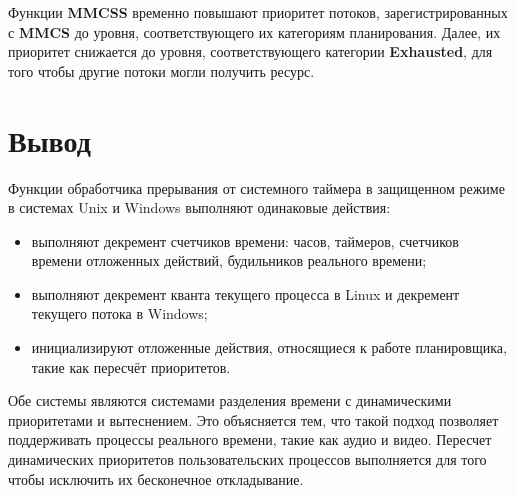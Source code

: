 Функции \textbf{MMCSS} временно повышают приоритет потоков, зарегистрированных с \textbf{MMCS} до уровня, соответствующего их категориям планирования. Далее, их приоритет снижается до уровня, соответствующего категории \textbf{Exhausted}, для того чтобы другие потоки могли получить ресурс.

\section*{Вывод}

Функции обработчика прерывания от системного таймера в защищенном режиме в системах Unix и Windows выполняют одинаковые действия:

\begin{itemize} 
	\item выполняют декремент счетчиков времени: часов, таймеров, счетчиков времени отложенных действий, будильников реального времени;
	\item выполняют декремент кванта текущего процесса в Linux и декремент текущего потока в Windows;
	\item инициализируют отложенные действия, относящиеся к работе планировщика, такие как пересчёт приоритетов.
\end{itemize} 

\noindent Обе системы являются системами разделения времени с динамическими приоритетами и вытеснением. Это объясняется тем, что такой подход позволяет поддерживать процессы реального времени, такие как аудио и видео. Пересчет динамических приоритетов пользовательских процессов выполняется для того чтобы исключить их бесконечное откладывание.


